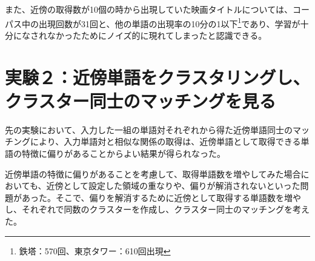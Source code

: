 また、近傍の取得数が10個の時から出現していた映画タイトルについては、コーパス中の出現回数が31回と、他の単語の出現率の10分の1以下\footnote{鉄塔：570回、東京タワー：610回出現}であり、学習が十分になされなかったためにノイズ的に現れてしまったと認識できる。

\section{実験２：近傍単語をクラスタリングし、クラスター同士のマッチングを見る}
先の実験において、入力した一組の単語対それぞれから得た近傍単語同士のマッチングにより、入力単語対と相似な関係の取得は、近傍単語として取得できる単語の特徴に偏りがあることからよい結果が得られなった。

近傍単語の特徴に偏りがあることを考慮して、取得単語数を増やしてみた場合においても、近傍として設定した領域の重なりや、偏りが解消されないといった問題があった。そこで、偏りを解消するために近傍として取得する単語数を増やし、それぞれで同数のクラスターを作成し、クラスター同士のマッチングを考えた。



